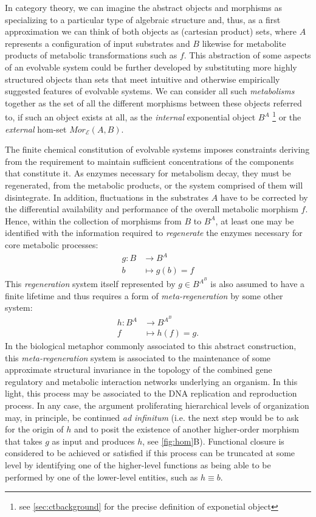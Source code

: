 \documentclass[10pt]{article}
\theoremstyle{plain}
\theoremstyle{definition}
\theoremstyle{remark}
\begin{document}
In category theory, we can imagine the abstract objects and morphisms as specializing to a particular type of algebraic structure and, thus, as a first approximation we can think of both objects as (cartesian product) sets, where $A$ represents a configuration of input substrates and $B$ likewise for metabolite products of metabolic transformations such as $f$. This abstraction of some aspects of an evolvable system could be further developed by substituting more highly structured objects than sets that meet intuitive and otherwise empirically suggested features of evolvable systems. We can consider all such \emph{metabolisms} together as the set of all the different morphisms between these objects referred to, if such an object exists at all, as the \emph{internal} exponential object $B^A$ \footnote{see \ref{sec:ctbackground} for the precise definition of exponetial object} or the \emph{external} hom-set $Mor_{\mathcal{E}}(A,B)$.

The finite chemical constitution of evolvable systems imposes constraints deriving from the requirement to maintain sufficient concentrations of the components that constitute it. As enzymes necessary for metabolism decay, they must be regenerated, from the metabolic products, or the system comprised of them will disintegrate. In addition, fluctuations in the substrates $A$ have to be corrected by the differential availability and performance of the overall metabolic morphism $f$. Hence, within the collection of morphisms from $B$ to $B^A$, at least one may be identified with the information required to \emph{regenerate} the enzymes necessary for core metabolic processes:
\begin{align*}
g \colon B &\longrightarrow B^A\\
b &\longmapsto g(b)=f
\end{align*}
This \emph{regeneration} system itself represented by $g \in B^{A^B}$ is also assumed to have a finite lifetime and thus requires a form of \emph{meta-regeneration} by some other system:
\begin{align*}
h \colon B^A & \longrightarrow B^{A^B}\\
f & \longmapsto h(f)=g.
\end{align*}
In the biological metaphor commonly associated to this abstract construction, this \emph{meta-regeneration} system is associated to the maintenance of some approximate structural invariance in the topology of the combined gene regulatory and metabolic interaction networks underlying an organism. In this light, this process may be associated to the DNA replication and reproduction process. In any case, the argument proliferating hierarchical levels of organization may, in principle, be continued \emph{ad infinitum} (i.e. the next step would be to ask for the origin of $h$ and to posit the existence of another higher-order morphism that takes $g$ as input and produces $h$, see \ref{fig:hom}B). Functional closure is considered to be achieved or satisfied if this process can be truncated at some level by identifying one of the higher-level functions as being able to be performed by one of the lower-level entities, such as $h \equiv b$.
\end{document}
